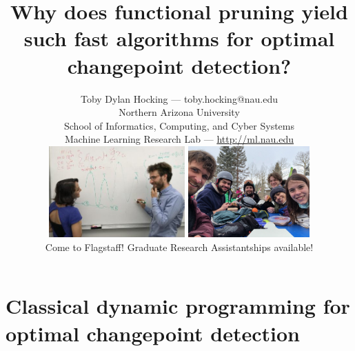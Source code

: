 \documentclass{beamer}
\begin{document}
\title{Why does functional pruning yield such fast algorithms for
  optimal changepoint detection?}

\author{
  Toby Dylan Hocking --- toby.hocking@nau.edu\\ 
  Northern Arizona University\\
  School of Informatics, Computing, and Cyber Systems\\
  Machine Learning Research Lab --- \url{http://ml.nau.edu}\\
  \includegraphics[height=3.5cm]{photo-atiyeh-whiteboard}
  \includegraphics[height=3.5cm]{2021-03-lab-ski-lunch} \\
  Come to Flagstaff! Graduate Research Assistantships available!
}

\date{}

\maketitle 

\section{Classical dynamic programming for optimal changepoint detection}
\end{document}

